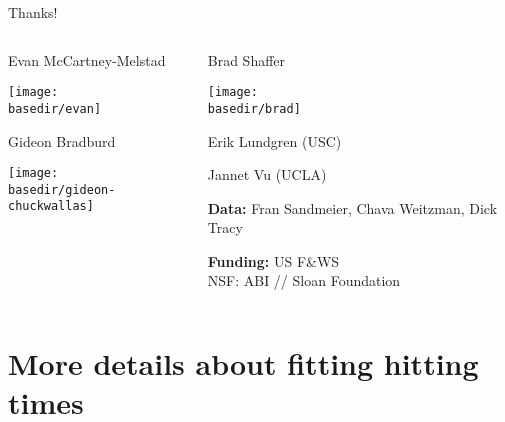 \documentclass{beamer}
\newcommand{\basedir}{files}
\begin{document}
\begin{frame}

  \begin{center}
    {\Large Thanks! }



  \begin{columns}[c]
    \begin{column}{.4\textwidth}
      \begin{center}
          {Evan McCartney-Melstad}

          \texttt{[image: \\basedir/evan]}

      {Gideon Bradburd}

          \texttt{[image: \\basedir/gideon-chuckwallas]}

      \end{center}
    \end{column}
    \begin{column}{.6\textwidth}

        \vspace{-2em}
      {Brad Shaffer}

        \texttt{[image: \\basedir/brad]}

        Erik Lundgren (USC)
      \vspace{0.5em}

        Jannet Vu (UCLA)
      \vspace{0.5em}

      \textbf{Data:}
      Fran Sandmeier, Chava Weitzman, Dick Tracy
      \vspace{0.5em}

      \textbf{Funding:}
        US F\&WS \\
      NSF: ABI // 
      Sloan Foundation

    \end{column}
  \end{columns}


  \end{center}
\end{frame}



\section*{More details about fitting hitting times}
\end{document}
